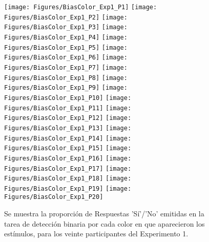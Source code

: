 \begin{figure}[th]
\centering
\texttt{[image: Figures/BiasColor\_Exp1\_P1]} \texttt{[image: Figures/BiasColor\_Exp1\_P2]} \texttt{[image: Figures/BiasColor\_Exp1\_P3]}
\texttt{[image: Figures/BiasColor\_Exp1\_P4]} \texttt{[image: Figures/BiasColor\_Exp1\_P5]} \texttt{[image: Figures/BiasColor\_Exp1\_P6]}
\texttt{[image: Figures/BiasColor\_Exp1\_P7]} \texttt{[image: Figures/BiasColor\_Exp1\_P8]} \texttt{[image: Figures/BiasColor\_Exp1\_P9]}
\texttt{[image: Figures/BiasColor\_Exp1\_P10]} \texttt{[image: Figures/BiasColor\_Exp1\_P11]} \texttt{[image: Figures/BiasColor\_Exp1\_P12]}
\texttt{[image: Figures/BiasColor\_Exp1\_P13]} \texttt{[image: Figures/BiasColor\_Exp1\_P14]} \texttt{[image: Figures/BiasColor\_Exp1\_P15]}
\texttt{[image: Figures/BiasColor\_Exp1\_P16]} \texttt{[image: Figures/BiasColor\_Exp1\_P17]} \texttt{[image: Figures/BiasColor\_Exp1\_P18]}
\texttt{[image: Figures/BiasColor\_Exp1\_P19]} \texttt{[image: Figures/BiasColor\_Exp1\_P20]} 
\caption[Proporción de Respuestas Sí/No por Color; Experimento 1]{Se muestra la proporción de Respuestas 'Sí'/'No' emitidas en la tarea de detección binaria por cada color en que aparecieron los estímulos, para los veinte participantes del Experimento 1.}
\label{fig:BiasCol_E1}
\end{figure}

